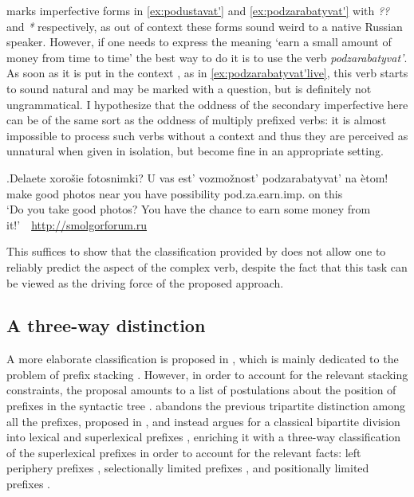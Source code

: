 \cite{Kagan:book} marks imperfective forms in \ref{ex:podustavat'} and \ref{ex:podzarabatyvat'} with \textit{??} and \textit{*} respectively, as out of context   these forms sound weird to a native Russian speaker. However, if one needs to express the meaning `earn a small amount of money from time to time' the best way to do it is to use the verb \textit{podzarabatyvat'}. As soon as it is put in the context , as in \ref{ex:podzarabatyvat'live}, this verb starts to sound natural and may be marked with a question, but is definitely not ungrammatical. I hypothesize that the oddness of the secondary imperfective  here can be of the same sort as the oddness of multiply prefixed verbs: it is almost impossible to process such verbs without a context   and thus they are perceived as unnatural when given in isolation, but become fine in an appropriate setting.

\exg.\label{ex:podzarabatyvat'live}Delaete xoro\v{s}ie fotosnimki? U vas est' vozmo\v{z}nost' podzarabatyvat' na \`{e}tom!\\
make good photos near you have possibility pod.za.earn.imp. on this\\
\trans `Do you take good photos? You have the chance to earn some money from it!'~~\hbox{}\hfill\hbox{\url{http://smolgorforum.ru}}

This suffices to show that the classification provided by \citet{Tatevosov:07} does not allow one to reliably predict the aspect of the complex verb, despite the fact that this task can be viewed as the driving force of the proposed approach. 

\subsection{A three-way distinction}\label{section:Tat09}
A more elaborate classification is proposed in \citealt{Tatevosov:09}, which is mainly dedicated to the problem of prefix stacking . However, in order to account for the relevant stacking constraints, the proposal amounts to a list of postulations about the position of prefixes in the syntactic tree . \citet{Tatevosov:09} abandons the previous tripartite distinction among all the prefixes, proposed in \citet{Tatevosov:07}, and instead argues for a classical bipartite division into lexical and superlexical prefixes , enriching it with a three-way classification  of the superlexical prefixes  in order to account for the relevant facts: left periphery prefixes , selectionally limited prefixes , and positionally limited prefixes .

